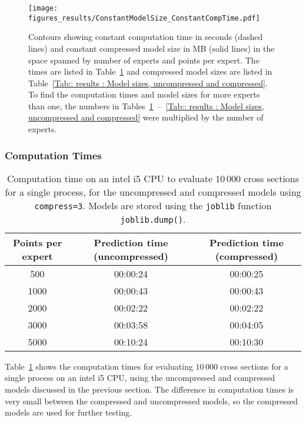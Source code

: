 \documentclass[twoside,english]{uiofysmaster}
\begin{document}
{{\begin{figure}
\centering
\texttt{[image: figures\_results/ConstantModelSize\_ConstantCompTime.pdf]}
\caption{Contours showing constant computation time in seconds (dashed lines) and constant compressed model size in MB (solid lines) in the space spanned by number of experts and points per expert. The times are listed in Table~\ref{Tab:: results : Computation times, uncompressed and compressed} and compressed model sizes are listed in Table~\ref{Tab:: results : Model sizes, uncompressed and compressed}. To find the computation times and model sizes for more experts than one, the numbers in Tables~\ref{Tab:: results : Computation times, uncompressed and compressed}~--~\ref{Tab:: results : Model sizes, uncompressed and compressed} were multiplied by the number of experts.}
\label{Fig:: results : Contours of constant time and storage size}
\end{figure}





\subsubsection{Computation Times}



\begin{table}
\centering
\begin{tabular}{@{}ccc@{}} \toprule
Points per expert & Prediction time (uncompressed) & Prediction time (compressed)\\ \midrule
500 & 00:00:24 & 00:00:25\\ 
1000 & 00:00:43 & 00:00:43\\
2000 & 00:02:22 & 00:02:22\\
3000 & 00:03:58 & 00:04:05\\
5000 & 00:10:24 & 00:10:30\\ \bottomrule
\end{tabular}
\caption{Computation time on an intel i5 CPU to evaluate $10\,000$ cross sections for a single process, for the uncompressed and compressed models using {\tt compress=3}. Models are stored using the {\tt joblib} function {\tt joblib.dump()}.}
\label{Tab:: results : Computation times, uncompressed and compressed}
\end{table}

Table~\ref{Tab:: results : Computation times, uncompressed and compressed} shows the computation times for evaluating  $10\,000$ cross sections for a single process on an intel i5 CPU, using the uncompressed and compressed models discussed in the previous section. The difference in computation times is very small between the compressed and uncompressed models, so the compressed models are used for further testing. 

}}
\end{document}
